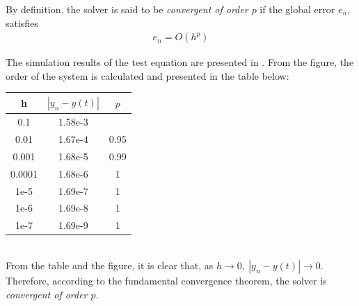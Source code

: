 By definition, the solver is said to be \textit{convergent of order $p$} if the global error $e_n$, satisfies
\begin{align*}
	e_n = O(h^p)
\end{align*}

The simulation results of the test equation are presented in . From the figure, the order of the system is calculated and presented in the table below:
\begin{table}[h!]
	\centering
	\begin{tabular}{c|c|c}
		h & $|y_n - y(t)|$ & $p$ \\
		\hline
		0.1 & 1.58e-3 & \\
		0.01 & 1.67e-4 & 0.95\\
		0.001 & 1.68e-5 & 0.99 \\
		0.0001 & 1.68e-6 & 1 \\
		1e-5 & 1.69e-7 & 1 \\
		1e-6 & 1.69e-8 & 1 \\		
		1e-7 & 1.69e-9 & 1 	
	\end{tabular}
\end{table}\\
From the table and the figure, it is clear that, as $h\rightarrow0,\ |y_n - y(t)| \rightarrow0$. Therefore, according to the fundamental convergence theorem, the solver is \textit{convergent of order $p$}. %

